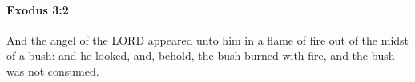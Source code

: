 
		\paragraph{Exodus 3:2} %
			\label{EXODUS-3-2}

			And the angel of the LORD appeared unto him in a flame of fire out of the midst of a bush: and he looked, and, behold, the bush burned with fire, and the bush was not consumed.


